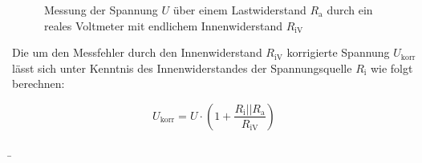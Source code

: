 \begin{frame}
{		\begin{figure}[h!]
		\begin{center}
			




		\end{center}
		\label{fig:voltmeterreal}
		\caption{Messung der Spannung $U$ über einem Lastwiderstand $R_\mathrm{a}$ durch ein reales
		 Voltmeter mit endlichem Innenwiderstand $R_\mathrm{iV}$}
		
	\end{figure}

	Die um den Messfehler durch den Innenwiderstand $R_\mathrm{iV}$ korrigierte
	 Spannung $U_\mathrm{korr}$ lässt sich unter Kenntnis des Innenwiderstandes der Spannungsquelle
	 $R_\mathrm{i}$ wie folgt berechnen:

	 \begin{equation*}
		U_{\mathrm{korr}}= U\cdot\left(1+\frac{R_{\mathrm{i}}||R_{\mathrm{a}}}{R_{\mathrm{iV}}}\right)
	\end{equation*}

	}

	\b{


}
\end{frame}
